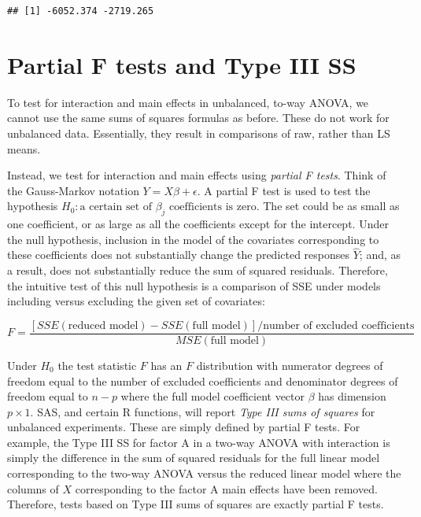\documentclass[
]{book}
\begin{document}
\begin{verbatim}
## [1] -6052.374 -2719.265
\end{verbatim}

\hypertarget{partial-f-tests-and-type-iii-ss}{%
\section{Partial F tests and Type III SS}\label{partial-f-tests-and-type-iii-ss}}

To test for interaction and main effects in unbalanced, to-way ANOVA, we cannot use the same sums of squares formulas as before. These do not work for unbalanced data. Essentially, they result in comparisons of raw, rather than LS means.

Instead, we test for interaction and main effects using \emph{partial F tests}. Think of the Gauss-Markov notation \(Y=X\beta+\epsilon\). A partial F test is used to test the hypothesis \(H_0:\text{a certain set of }\beta_j\text{ coefficients is zero}\). The set could be as small as one coefficient, or as large as all the coefficients except for the intercept. Under the null hypothesis, inclusion in the model of the covariates corresponding to these coefficients does not substantially change the predicted responses \(\hat Y\); and, as a result, does not substantially reduce the sum of squared residuals. Therefore, the intuitive test of this null hypothesis is a comparison of SSE under models including versus excluding the given set of covariates:

\[F = \frac{[SSE(\text{reduced model}) - SSE(\text{full model})]/\text{number of excluded coefficients}}{MSE(\text{full model})}\]

Under \(H_0\) the test statistic \(F\) has an \(F\) distribution with numerator degrees of freedom equal to the number of excluded coefficients and denominator degrees of freedom equal to \(n-p\) where the full model coefficient vector \(\beta\) has dimension \(p\times 1\).
SAS, and certain R functions, will report \emph{Type III sums of squares} for unbalanced experiments. These are simply defined by partial F tests. For example, the Type III SS for factor A in a two-way ANOVA with interaction is simply the difference in the sum of squared residuals for the full linear model corresponding to the two-way ANOVA versus the reduced linear model where the columns of \(X\) corresponding to the factor A main effects have been removed. Therefore, tests based on Type III sums of squares are exactly partial F tests.
\end{document}
